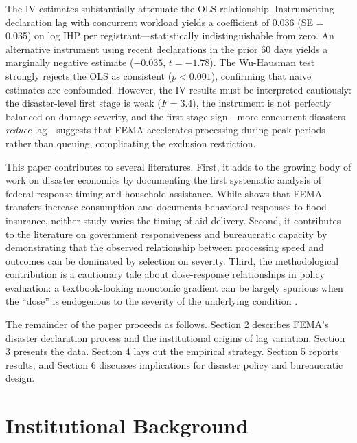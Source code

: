 \documentclass[12pt]{article}
\begin{document}
The IV estimates substantially attenuate the OLS relationship. Instrumenting declaration lag with concurrent workload yields a coefficient of 0.036 (SE = 0.035) on log IHP per registrant---statistically indistinguishable from zero. An alternative instrument using recent declarations in the prior 60 days yields a marginally negative estimate ($-0.035$, $t = -1.78$). The Wu-Hausman test strongly rejects the OLS as consistent ($p < 0.001$), confirming that naive estimates are confounded. However, the IV results must be interpreted cautiously: the disaster-level first stage is weak ($F = 3.4$), the instrument is not perfectly balanced on damage severity, and the first-stage sign---more concurrent disasters \textit{reduce} lag---suggests that FEMA accelerates processing during peak periods rather than queuing, complicating the exclusion restriction.

This paper contributes to several literatures. First, it adds to the growing body of work on disaster economics \citep{deryugina2017, gallagher2017, deryugina2018fiscal, boustan2020, billings2022} by documenting the first systematic analysis of federal response timing and household assistance. While \citet{deryugina2017} shows that FEMA transfers increase consumption and \citet{gallagher2017} documents behavioral responses to flood insurance, neither study varies the timing of aid delivery. Second, it contributes to the literature on government responsiveness and bureaucratic capacity \citep{besley2006, best2023, finan2017, finan2020} by demonstrating that the observed relationship between processing speed and outcomes can be dominated by selection on severity. Third, the methodological contribution is a cautionary tale about dose-response relationships in policy evaluation: a textbook-looking monotonic gradient can be largely spurious when the ``dose'' is endogenous to the severity of the underlying condition \citep{angrist2009, imbens2015}.

The remainder of the paper proceeds as follows. Section 2 describes FEMA's disaster declaration process and the institutional origins of lag variation. Section 3 presents the data. Section 4 lays out the empirical strategy. Section 5 reports results, and Section 6 discusses implications for disaster policy and bureaucratic design.


\section{Institutional Background}
\end{document}
